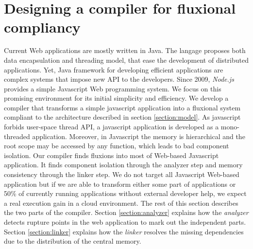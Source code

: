 \section{Designing a compiler for fluxional compliancy} \label{section:compiler}

Current Web applications are mostly written in Java. The langage proposes both data encapsulation and threading model, that ease the development of distributed applications.
Yet, Java framework for developing efficient applications are complex systems that impose new API\cite{Coward2003} to the developers.
Since 2009, \textit{Node.js}\cite{Dahl} provides a simple Javascript Web programming system.
We focus on this promising environment for its initial simplicity and efficiency.
We develop a compiler that transforms a simple javascript application into a fluxional system compliant to the architecture described in section \ref{section:model}.
As javascript forbids user-space thread API, a javascript application is developed as a mono-threaded application.
Moreover, in Javascript  the memory is hierarchical and the root scope may be accessed by any function, which leads to bad component isolation.
Our compiler finds fluxions into most of Web-based Javascript application.
It finds component isolation through the analyzer step and memory consistency through the linker step.
We do not target all Javascript Web-based application but if we are able to transform either some part of applications or 50\% of currently running applications without external developer help, we expect a real execution gain in a cloud environment.
The rest of this section describes the two parts of the compiler.
Section \ref{section:analyzer} explains how the \textit{analyzer} detects rupture points in the web application to mark out the independent parts.
Section \ref{section:linker} explains how the \textit{linker} resolves the missing dependencies due to the distribution of the central memory.

